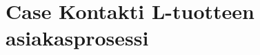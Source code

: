 \documentclass[finnish,12pt,a4paper,pdftex]{article}
\begin{document}









\section{Case Kontakti L-tuotteen asiakasprosessi}
\end{document}
